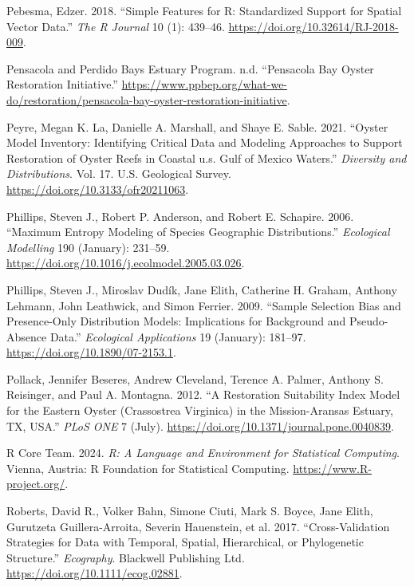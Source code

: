\documentclass[
  letterpaper,
  DIV=11,
  numbers=noendperiod]{scrartcl}
\newlength{\cslhangindent}
\newenvironment{CSLReferences}[2] %
 {\begin{list}{}{%
  \setlength{\itemindent}{0pt}
  \setlength{\leftmargin}{0pt}
  \setlength{\parsep}{0pt}
  \ifodd #1
   \setlength{\leftmargin}{\cslhangindent}
   \setlength{\itemindent}{-1\cslhangindent}
  \fi
  \setlength{\itemsep}{#2\baselineskip}}}
 {\end{list}}
\begin{document}
\begin{CSLReferences}{1}{0}
Pebesma, Edzer. 2018. {``{Simple Features for R: Standardized Support
for Spatial Vector Data}.''} \emph{{The R Journal}} 10 (1): 439--46.
\url{https://doi.org/10.32614/RJ-2018-009}.

Pensacola and Perdido Bays Estuary Program. n.d. {``Pensacola Bay Oyster
Restoration Initiative.''}
\url{https://www.ppbep.org/what-we-do/restoration/pensacola-bay-oyster-restoration-initiative}.

Peyre, Megan K. La, Danielle A. Marshall, and Shaye E. Sable. 2021.
{``Oyster Model Inventory: Identifying Critical Data and Modeling
Approaches to Support Restoration of Oyster Reefs in Coastal u.s. Gulf
of Mexico Waters.''} \emph{Diversity and Distributions}. Vol. 17. U.S.
Geological Survey. \url{https://doi.org/10.3133/ofr20211063}.

Phillips, Steven J., Robert P. Anderson, and Robert E. Schapire. 2006.
{``Maximum Entropy Modeling of Species Geographic Distributions.''}
\emph{Ecological Modelling} 190 (January): 231--59.
\url{https://doi.org/10.1016/j.ecolmodel.2005.03.026}.

Phillips, Steven J., Miroslav Dudík, Jane Elith, Catherine H. Graham,
Anthony Lehmann, John Leathwick, and Simon Ferrier. 2009. {``Sample
Selection Bias and Presence-Only Distribution Models: Implications for
Background and Pseudo-Absence Data.''} \emph{Ecological Applications} 19
(January): 181--97. \url{https://doi.org/10.1890/07-2153.1}.

Pollack, Jennifer Beseres, Andrew Cleveland, Terence A. Palmer, Anthony
S. Reisinger, and Paul A. Montagna. 2012. {``A Restoration Suitability
Index Model for the Eastern Oyster (Crassostrea Virginica) in the
Mission-Aransas Estuary, TX, USA.''} \emph{PLoS ONE} 7 (July).
\url{https://doi.org/10.1371/journal.pone.0040839}.

R Core Team. 2024. \emph{R: A Language and Environment for Statistical
Computing}. Vienna, Austria: R Foundation for Statistical Computing.
\url{https://www.R-project.org/}.

Roberts, David R., Volker Bahn, Simone Ciuti, Mark S. Boyce, Jane Elith,
Gurutzeta Guillera-Arroita, Severin Hauenstein, et al. 2017.
{``Cross-Validation Strategies for Data with Temporal, Spatial,
Hierarchical, or Phylogenetic Structure.''} \emph{Ecography}. Blackwell
Publishing Ltd. \url{https://doi.org/10.1111/ecog.02881}.


\end{CSLReferences}
\end{document}
